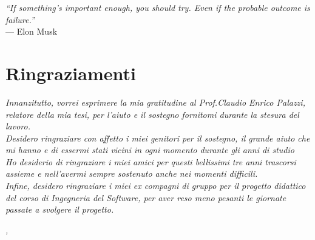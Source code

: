 
\cleardoublepage
{}
{}

\begin{flushright}{
	\slshape    
	``If something's important enough, you should try. Even if the probable outcome is failure.''} \\ 
	\medskip
   	--- Elon Musk %
\end{flushright}


\bigskip

\begingroup
\let\clearpage\relax
\let\cleardoublepage\relax
\let\cleardoublepage\relax

\chapter*{Ringraziamenti}

\noindent \textit{Innanzitutto, vorrei esprimere la mia gratitudine al Prof.Claudio Enrico Palazzi, relatore della mia tesi, per l'aiuto e il sostegno fornitomi durante la stesura del lavoro.}\\

\noindent \textit{Desidero ringraziare con affetto i miei genitori per il sostegno, il grande aiuto che mi hanno e di essermi stati vicini in ogni momento durante gli anni di studio}\\

\noindent \textit{Ho desiderio di ringraziare i miei amici per questi bellissimi tre anni trascorsi assieme e nell'avermi sempre sostenuto anche nei momenti difficili.}\\

\noindent \textit{Infine, desidero ringraziare i miei ex compagni di gruppo per il progetto didattico del corso di Ingegneria del Software, per aver reso meno pesanti le giornate passate a svolgere il progetto.}
\bigskip

\noindent\textit{\myLocation, \myTime}
\hfill \myName

\endgroup

